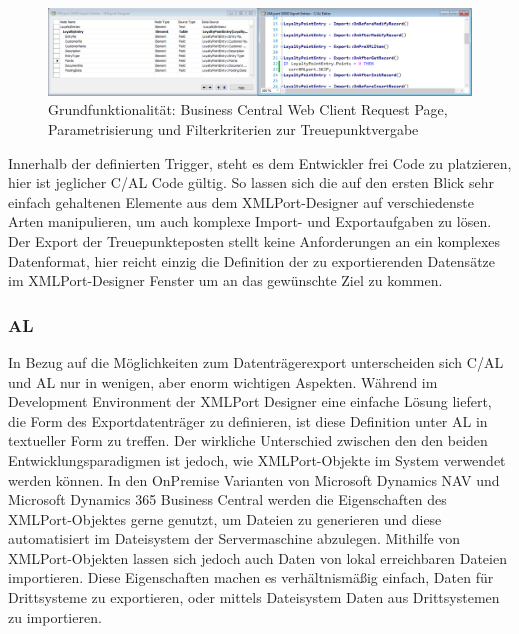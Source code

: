 \begin{figure}[h]
	\centering
	\includegraphics[width=145mm]{images/xmlport}
	\caption{Grundfunktionalität: Business Central Web Client Request Page, Parametrisierung und Filterkriterien zur Treuepunktvergabe}
	\label{fig:Request Page}
\end{figure}

Innerhalb der definierten Trigger, steht es dem Entwickler frei Code zu platzieren, hier ist jeglicher C/AL Code gültig. So lassen sich die auf den ersten Blick sehr einfach gehaltenen Elemente aus dem XMLPort-Designer auf verschiedenste Arten manipulieren, um auch komplexe Import- und Exportaufgaben zu lösen. Der Export der Treuepunkteposten stellt keine Anforderungen an ein komplexes Datenformat, hier reicht einzig die Definition der zu exportierenden Datensätze im XMLPort-Designer Fenster um an das gewünschte Ziel zu kommen.
\pagebreak


\subsubsection{AL}
In Bezug auf die Möglichkeiten zum Datenträgerexport unterscheiden sich C/AL und AL nur in wenigen, aber enorm wichtigen Aspekten. Während im Development Environment der XMLPort Designer eine einfache Lösung liefert, die Form des Exportdatenträger zu definieren, ist diese Definition unter AL in textueller Form zu treffen. Der wirkliche Unterschied zwischen den den beiden Entwicklungsparadigmen ist jedoch, wie XMLPort-Objekte im System verwendet werden können. In den OnPremise Varianten von Microsoft Dynamics NAV und Microsoft Dynamics 365 Business Central werden die Eigenschaften des XMLPort-Objektes gerne genutzt, um Dateien zu generieren und diese automatisiert im Dateisystem der Servermaschine abzulegen. Mithilfe von XMLPort-Objekten lassen sich jedoch auch Daten von lokal erreichbaren Dateien importieren. Diese Eigenschaften machen es verhältnismäßig einfach, Daten für Drittsysteme zu exportieren, oder mittels Dateisystem Daten aus Drittsystemen zu importieren. 
\linebreak

